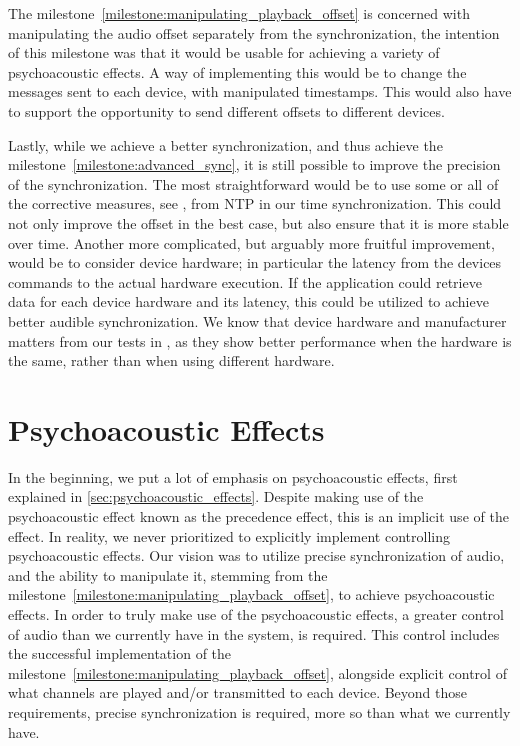 \bigskip
The milestone~\ref{milestone:manipulating_playback_offset} is concerned with manipulating the audio offset separately from the synchronization, the intention of this milestone was that it would be usable for achieving a variety of psychoacoustic effects.
A way of implementing this would be to change the  messages sent to each device, with manipulated timestamps.
This would also have to support the opportunity to send different offsets to different devices.

\bigskip
Lastly, while we achieve a better synchronization, and thus achieve the milestone~\ref{milestone:advanced_sync}, it is still possible to improve the precision of the synchronization.
The most straightforward would be to use some or all of the corrective measures, see , from \ac{NTP} in our time synchronization.
This could not only improve the offset in the best case, but also ensure that it is more stable over time.
Another more complicated, but arguably more fruitful improvement, would be to consider device hardware; in particular the latency from the devices commands to the actual hardware execution.
If the application could retrieve data for each device hardware and its latency, this could be utilized to achieve better audible synchronization.
We know that device hardware and manufacturer matters from our tests in , as they show better performance when the hardware is the same, rather than when using different hardware.

\section{Psychoacoustic Effects}
In the beginning, we put a lot of emphasis on psychoacoustic effects, first explained in \cref{sec:psychoacoustic_effects}.
Despite making use of the psychoacoustic effect known as the precedence effect, this is an implicit use of the effect.
In reality, we never prioritized to explicitly implement controlling psychoacoustic effects.
Our vision was to utilize precise synchronization of audio, and the ability to manipulate it, stemming from the milestone~\ref{milestone:manipulating_playback_offset}, to achieve psychoacoustic effects.
In order to truly make use of the psychoacoustic effects, a greater control of audio than we currently have in the system, is required.
This control includes the successful implementation of the milestone~\ref{milestone:manipulating_playback_offset}, alongside explicit control of what channels are played and/or transmitted to each device.
Beyond those requirements, precise synchronization is required, more so than what we currently have.

